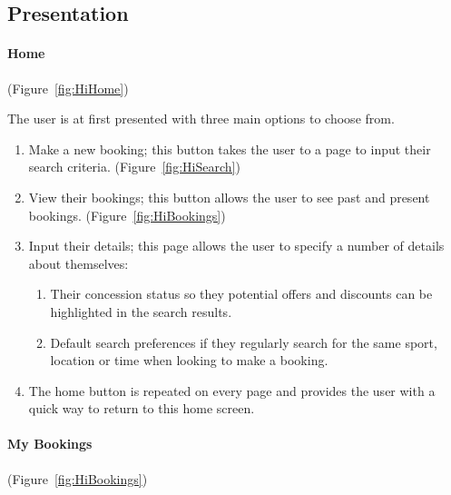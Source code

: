 
\subsection{Presentation}

\paragraph{Home} (Figure~\ref{fig:HiHome})


The user is at first presented with three main options to choose from.
\begin{enumerate}
	\item Make a new booking; this button takes the user to a page to input
		their search criteria. (Figure~\ref{fig:HiSearch})
	\item View their bookings; this button allows the user to see past and
		present bookings. (Figure~\ref{fig:HiBookings})
	\item Input their details; this page allows the user to specify a number
		of details about themselves:

		\begin{enumerate}
			\item Their concession status so they potential offers and
				discounts can be highlighted in the search results.
			\item Default search preferences if they regularly search for the
				same sport, location or time when looking to make a booking.
		\end{enumerate}
	\item The home button is repeated on every page and provides the user with
		a quick way to return to this home screen.
\end{enumerate}

\paragraph{My Bookings} (Figure~\ref{fig:HiBookings})


